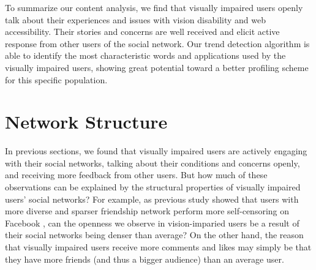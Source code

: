 \documentclass{sigchi}
\begin{document}
To summarize our content analysis, we find that visually impaired users openly talk about their experiences and issues with vision disability and web accessibility. Their stories and concerns are well received and elicit active response from other users of the social network. Our trend detection algorithm is able to identify the most characteristic words and applications used by the visually impaired users, showing great potential toward a better profiling scheme for this specific population.

 










\section{Network Structure}

In previous sections, we found that visually impaired users are actively engaging with their social networks, talking about their conditions and concerns openly, and receiving more feedback from other users. But how much of these observations can be explained by the structural properties of visually impaired users' social networks? For example, as previous study showed that users with more diverse and sparser friendship network perform more self-censoring on Facebook \cite{das2013}, can the openness we observe in vision-imparied users be a result of their social networks being denser than average? On the other hand, the reason that visually impaired users receive more comments and likes may simply be that they have more friends (and thus a bigger audience) than an average user.
\end{document}
